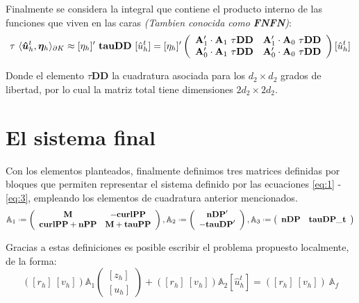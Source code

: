 \documentclass{article}
\begin{document}
\noindent Finalmente se considera la integral que contiene el producto interno de las funciones que viven en las caras \textit{(Tambien conocida como \textbf{FNFN})}:
\begin{align}
    \tau~\langle \boldsymbol{\hat{u}}_h^t, \boldsymbol{\eta}_h \rangle_{\partial K} \approx
    [\eta_h]'~\mathbf{tauDD}~[\hat{u}^t_h]  =
    [\eta_h]'
    \left(
    \begin{array}{cc}
        \mathbf{A}_1' \cdot \mathbf{A}_1~\mathbf{\tau DD} & \mathbf{A}_1' \cdot \mathbf{A}_0~\mathbf{\tau DD} \\
        \mathbf{A}_0' \cdot \mathbf{A}_1~\mathbf{\tau DD} & \mathbf{A}_0' \cdot \mathbf{A}_0~\mathbf{\tau DD} \\
    \end{array}
    \right)
    [\hat{u}^t_h]
\end{align}

\noindent Donde el elemento $\tau \mathbf{DD}$ la cuadratura asociada para los $d_2 \times d_2$ grados de libertad, por lo cual la matriz total tiene dimensiones $2d_2 \times 2d_2$.

\section{El sistema final}

\noindent Con los elementos planteados, finalmente definimos tres matrices definidas por bloques que permiten representar el sistema definido por las ecuaciones \eqref{eq:1} - \eqref{eq:3}, empleando los elementos de cuadratura anterior mencionados.
\begin{align}
    \mathbb{A}_1 \defeq
    \left (
    \begin{array}{cc}
        \mathbf{M} & -\mathbf{curlPP} \\
        \mathbf{curlPP} + \mathbf{nPP} & \mathbf{M} + \mathbf{tauPP}
    \end{array}
    \right ),
        \mathbb{A}_2 \defeq
    \left (
    \begin{array}{cc}
        \mathbf{nDP}' \\
        -\mathbf{tauDP}'
    \end{array}
    \right ),
        \mathbb{A}_3 \defeq
    \left (
    \begin{array}{cc}
        \mathbf{nDP} & \mathbf{tauDP\_t}
    \end{array}
    \right )
\end{align}

\noindent Gracias a estas definiciones es posible escribir el problema propuesto localmente, de la forma:
\begin{equation*}
    \left ( [r_h]~[v_h] \right )
    \mathbb{A}_1
    \left(
    \begin{array}{cc}
        {[z_h]} \\
        {[u_h]}
    \end{array}
    \right )
    + \left ( [r_h] ~ [v_h] \right )
    \mathbb{A}_2 [\hat{u}^t_h]
    = \left ( [r_h] ~ [v_h] \right )~\mathbb{A}_f
\end{equation*}
\end{document}
